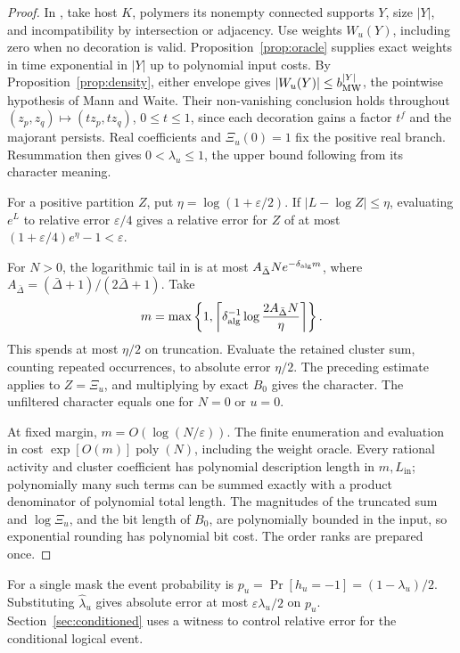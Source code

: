 \documentclass[10pt,twocolumn]{article}
\theoremstyle{definition}
\DeclareMathOperator{\poly}{poly}
\newcommand{\Lin}{L_{\mathrm{in}}}
\begin{document}
\begin{proof}
In \cite[Thm.~1]{MW25}, take host $K$, polymers its nonempty connected
supports $Y$, size $|Y|$, and incompatibility by intersection or adjacency.
Use weights $W_u(Y)$, including zero when no decoration is valid.
Proposition~\ref{prop:oracle} supplies exact weights in time exponential
in $|Y|$ up to polynomial input costs. By Proposition~\ref{prop:density},
either envelope gives $|W_u(Y)|\le b_{\rm MW}^{|Y|}$, the pointwise
hypothesis of Mann and Waite.
Their non-vanishing conclusion holds throughout
$(z_p,z_q)\mapsto(tz_p,tz_q)$, $0\le t\le1$, since each decoration
gains a factor $t^f$ and the majorant persists. Real coefficients and
$\Xi_u(0)=1$ fix the positive real branch. Resummation then gives
$0<\lambda_u\le1$, the upper bound following from its character meaning.

For a positive partition $Z$, put $\eta=\log(1+\varepsilon/2)$.
If $|L-\log Z|\le\eta$, evaluating $e^L$ to relative error
$\varepsilon/4$ gives a relative error for $Z$ of at most
$(1+\varepsilon/4)e^\eta-1<\varepsilon$.

For $N>0$, the logarithmic tail in \cite[Lemma~1]{MW25} is at most
$A_{\bar\Delta}Ne^{-\delta_{\rm alg}m}$, where
$A_{\bar\Delta}=(\bar\Delta+1)/(2\bar\Delta+1)$. Take
\[
 m=\max\left\{1,\left\lceil\delta_{\rm alg}^{-1}
       \log\frac{2A_{\bar\Delta}N}{\eta}\right\rceil\right\}.
\]
This spends at most $\eta/2$ on truncation. Evaluate the retained
cluster sum, counting repeated occurrences, to absolute error
$\eta/2$. The preceding estimate applies to $Z=\Xi_u$, and multiplying
by exact $B_0$ gives the character. The unfiltered character equals one
for $N=0$ or $u=0$.

At fixed margin, $m=O(\log(N/\varepsilon))$. The finite enumeration
and evaluation in \cite[Lemmas~2--4]{MW25} cost
$\exp[O(m)]\poly(N)$, including the weight oracle. Every rational
activity and cluster coefficient has polynomial description length in
$m,\Lin$; polynomially many such terms can be summed exactly with a
product denominator of polynomial total length. The magnitudes of the
truncated sum and $\log\Xi_u$, and the bit length of $B_0$, are
polynomially bounded in the input, so exponential rounding has
polynomial bit cost. The order ranks are prepared once.
\end{proof}

For a single mask the event probability is
$p_u=\Pr[h_u=-1]=(1-\lambda_u)/2$.
Substituting $\widehat\lambda_u$ gives absolute error at most
$\varepsilon\lambda_u/2$ on $p_u$. Section~\ref{sec:conditioned}
uses a witness to control relative error for the conditional logical event.
\end{document}
